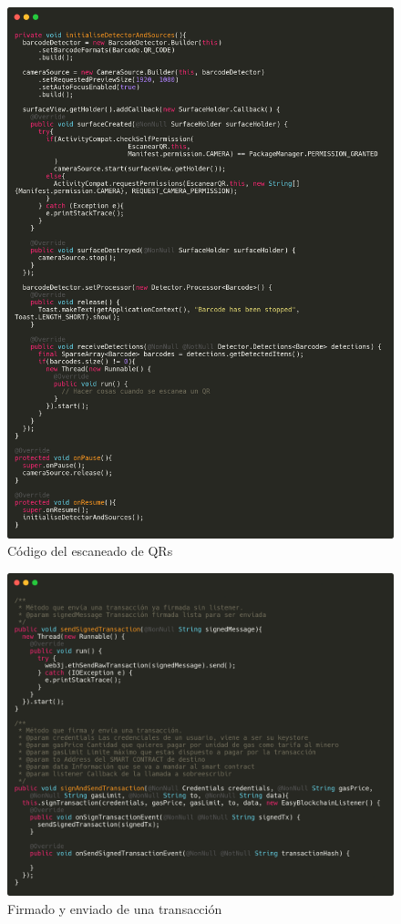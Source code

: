 \begin{figure}[h!]
  \centering
  \includegraphics[width=1\linewidth]{figs/Anexo/zxing}
  \caption[Código del escaneado de QRs]{Código del escaneado de QRs}
  \label{fig:escaneandoQRs}
\end{figure}

\begin{figure}[h!]
  \centering
  \includegraphics[width=1\linewidth]{figs/Anexo/firma_envia_completo}
  \caption[Firmado y enviado de una transacción]{Firmado y enviado de una transacción}
  \label{fig:firma_envia_completo}
\end{figure}

